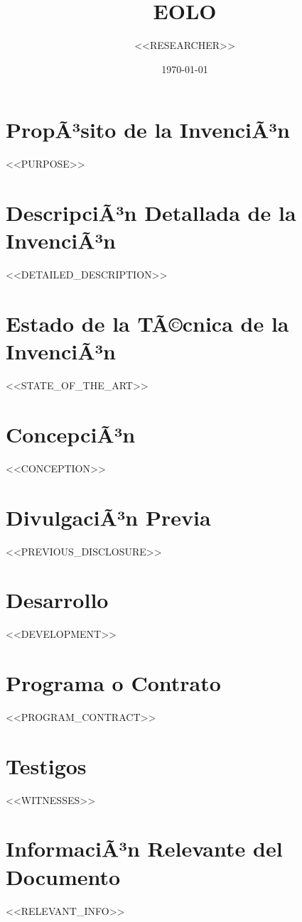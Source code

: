 \documentclass{article}
\title{EOLO}
\author{<<RESEARCHER>>}
\date{\today}
\begin{document}
\maketitle

\section*{PropÃ³sito de la InvenciÃ³n}
<<PURPOSE>>

\section*{DescripciÃ³n Detallada de la InvenciÃ³n}
<<DETAILED_DESCRIPTION>>

\section*{Estado de la TÃ©cnica de la InvenciÃ³n}
<<STATE_OF_THE_ART>>

\section*{ConcepciÃ³n}
<<CONCEPTION>>

\section*{DivulgaciÃ³n Previa}
<<PREVIOUS_DISCLOSURE>>

\section*{Desarrollo}
<<DEVELOPMENT>>

\section*{Programa o Contrato}
<<PROGRAM_CONTRACT>>

\section*{Testigos}
<<WITNESSES>>

\section*{InformaciÃ³n Relevante del Documento}
<<RELEVANT_INFO>>
\end{document}
